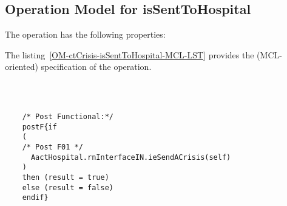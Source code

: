 \subsection{Operation Model for isSentToHospital}

\label{OM-isSentToHospital}


The  operation has the following properties:

	\begin{operationmodel}



		


	\end{operationmodel}



	\vspace{1cm}
	The listing~\ref{OM-ctCrisis-isSentToHospital-MCL-LST} provides the \msrmessir (MCL-oriented) specification of the operation.
	
	\scriptsize
	\vspace{0.5cm}
	\begin{lstlisting}[style=MessirStyle,firstnumber=auto,captionpos=b,caption={\msrmessir (MCL-oriented) specification of the operation \emph{isSentToHospital}.},label=OM-ctCrisis-isSentToHospital-MCL-LST]

	
	
	/* Post Functional:*/ 
	postF{if 
	(
	/* Post F01 */
	  AactHospital.rnInterfaceIN.ieSendACrisis(self)
	)
	then (result = true)
	else (result = false)
	endif}
	
	
	\end{lstlisting}
	\normalsize 
	
	
	
	





